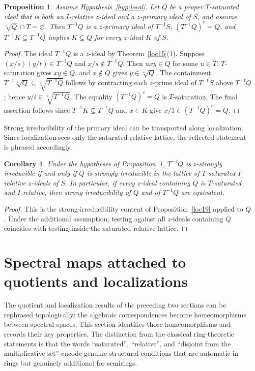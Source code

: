 \documentclass[11pt,leqno]{amsart}
\theoremstyle{plain}
\newtheorem{proposition}[theorem]{Proposition}
\newtheorem{corollary}[theorem]{Corollary}
\theoremstyle{definition}
\theoremstyle{remark}
\numberwithin{equation}{section}
\begin{document}
\begin{proposition}\label{loc20}
Assume Hypothesis~\ref{hyp:local}.
Let $Q$ be a proper $T$-saturated ideal that is both an
$I$-relative $z$-ideal and a $z$-primary ideal of $S$,
and assume $\sqrt[z]{Q}\cap T=\varnothing$.
Then $T^{-1}Q$ is a $z$-primary ideal of $T^{-1}S$,
$(T^{-1}Q)^c=Q$, and $T^{-1}K\subseteq T^{-1}Q$ implies
$K\subseteq Q$ for every $z$-ideal $K$ of $S$.
\end{proposition}
\begin{proof}
The ideal $T^{-1}Q$ is a $z$-ideal by Theorem~\ref{loc15}(1).
Suppose $(x/s)(y/t)\in T^{-1}Q$ and $x/s\notin T^{-1}Q$.
Then $uxy\in Q$ for some $u\in T$.
$T$-saturation gives $xy\in Q$, and $x\notin Q$ gives
$y\in\sqrt[z]{Q}$.
The containment $T^{-1}\sqrt[z]{Q}\subseteq\sqrt[z]{T^{-1}Q}$
follows by contracting each $z$-prime ideal of $T^{-1}S$
above $T^{-1}Q$; hence $y/t\in\sqrt[z]{T^{-1}Q}$.
The equality $(T^{-1}Q)^c=Q$ is $T$-saturation.
The final assertion follows since $T^{-1}K\subseteq T^{-1}Q$
and $x\in K$ give $x/1\in(T^{-1}Q)^c=Q$.
\end{proof}

Strong irreducibility of the primary ideal can be transported along
localization.
Since localization sees only the saturated relative lattice,
the reflected statement is phrased accordingly.

\begin{corollary}\label{cor:local-primary-strong}
Under the hypotheses of Proposition~\ref{loc20},
$T^{-1}Q$ is $z$-strongly irreducible if and only if $Q$ is strongly
irreducible in the lattice of $T$-saturated $I$-relative $z$-ideals
of $S$.
In particular, if every $z$-ideal containing $Q$ is $T$-saturated
and $I$-relative, then strong irreducibility of $Q$ and of $T^{-1}Q$
are equivalent.
\end{corollary}
\begin{proof}
This is the strong-irreducibility content of Proposition~\ref{loc19}
applied to $Q$.
Under the additional assumption, testing against all $z$-ideals
containing $Q$ coincides with testing inside the saturated
relative lattice.
\end{proof}

\section{Spectral maps attached to quotients and
localizations}\label{sec:spectral-maps}

The quotient and localization results of the preceding two sections
can be rephrased topologically: the algebraic correspondences
become homeomorphisms between spectral spaces.
This section identifies those homeomorphisms and records their
key properties.
The distinction from the classical ring-theoretic statements is that
the words ``saturated'', ``relative'', and ``disjoint from the
multiplicative set'' encode genuine structural conditions that
are automatic in rings but genuinely additional for semirings.
\end{document}
